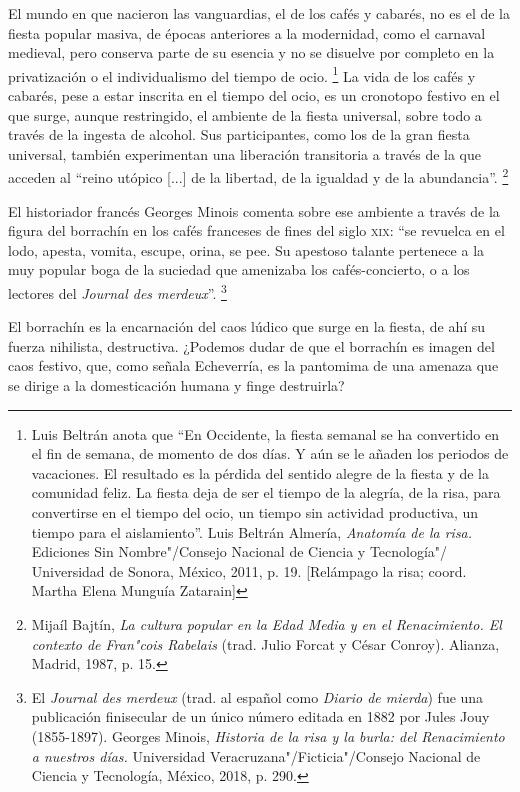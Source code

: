 \documentclass[14pt,twoside,final]{extbook} %
\let\oldfootnote\footnote
\renewcommand\footnote[1]{%
\oldfootnote{\hspace{1mm}#1}}
\begin{document}
El mundo en que nacieron las vanguardias, el de los cafés y cabarés, no es el de la fiesta popular masiva, de épocas anteriores a la modernidad, como el carnaval medieval, pero conserva parte de su
esencia y no se disuelve por completo en la privatización o el individualismo del tiempo de ocio.\footnote{Luis Beltrán anota que ``En Occidente, la fiesta semanal se ha convertido en el fin de semana, de momento de dos días. Y aún se le añaden los periodos de vacaciones. El resultado es la pérdida del sentido alegre de la fiesta y de la comunidad feliz. La fiesta deja de ser el tiempo de la alegría, de la risa, para convertirse en el tiempo del ocio, un tiempo sin actividad productiva, un tiempo para el aislamiento''. Luis Beltrán Almería, \emph{Anatomía de la risa.} Ediciones Sin Nombre"/Consejo Nacional de Ciencia y Tecnología"/ Universidad de Sonora, México, 2011, p. 19. [Relámpago la risa; coord. Martha Elena Munguía Zatarain]} La vida de los cafés y cabarés, pese a estar inscrita en el tiempo del ocio, es un cronotopo festivo en el que surge, aunque restringido, el ambiente de la fiesta universal, sobre todo a través de la ingesta de alcohol. Sus participantes, como los de la gran fiesta universal, también experimentan una liberación transitoria a través de la que acceden al ``reino utópico [...] de la libertad, de la igualdad y de la abundancia''.\footnote{Mijaíl Bajtín, \emph{La cultura popular en la Edad Media y en el Renacimiento. El contexto de Fran"cois Rabelais} (trad. Julio Forcat y César Conroy). Alianza, Madrid, 1987, p. 15.}

El historiador francés Georges Minois comenta sobre ese ambiente a través de la figura del borrachín en los cafés franceses de fines del siglo \textsc{xix}: ``se revuelca en el lodo, apesta, vomita, escupe, orina, se pee. Su apestoso talante pertenece a la muy popular boga de la suciedad que amenizaba los cafés-concierto, o a los lectores del \emph{Journal des merdeux}''.\footnote{El \emph{Journal des merdeux} (trad. al español como \emph{Diario de mierda}) fue una publicación finisecular de un único número editada en 1882 por Jules Jouy (1855-1897). Georges Minois, \emph{Historia de la risa y la burla: del Renacimiento a nuestros días.} Universidad Veracruzana"/Ficticia"/Consejo Nacional de Ciencia y Tecnología, México, 2018, p. 290.}

El borrachín es la encarnación del caos lúdico que surge en la fiesta, de ahí su fuerza nihilista, destructiva. ¿Podemos dudar de que el borrachín es imagen del caos festivo, que, como señala Echeverría, es la pantomima de una amenaza que se dirige a la domesticación humana y finge destruirla?
\end{document}
